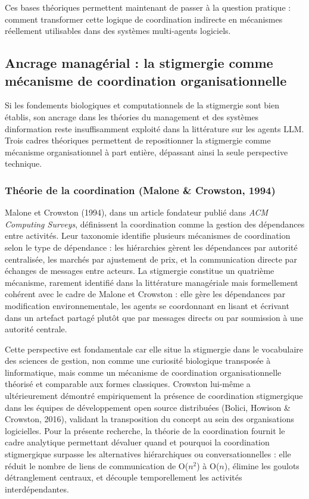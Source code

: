 \documentclass[12pt,a4paper]{article}
\begin{document}
Ces bases théoriques permettent maintenant de passer à la question
pratique : comment transformer cette logique de coordination indirecte
en mécanismes réellement utilisables dans des systèmes multi-agents
logiciels.

\subsection{Ancrage managérial : la stigmergie comme mécanisme de coordination organisationnelle}\label{ancrage-managuxe9rial--la-stigmergie-comme-muxe9canisme-de-coordination-organisationnelle}

Si les fondements biologiques et computationnels de la stigmergie sont
bien établis, son ancrage dans les théories du management et des
systèmes d\textquotesingle information reste insuffisamment exploité
dans la littérature sur les agents LLM. Trois cadres théoriques
permettent de repositionner la stigmergie comme mécanisme
organisationnel à part entière, dépassant ainsi la seule perspective
technique.

\subsubsection{Théorie de la coordination (Malone \& Crowston, 1994)}

Malone et Crowston (1994), dans un article fondateur publié dans
\emph{ACM Computing Surveys}, définissent la coordination comme la
gestion des dépendances entre activités. Leur taxonomie identifie
plusieurs mécanismes de coordination selon le type de dépendance :
les hiérarchies gèrent les dépendances par autorité centralisée, les
marchés par ajustement de prix, et la communication directe par
échanges de messages entre acteurs. La stigmergie constitue un
quatrième mécanisme, rarement identifié dans la littérature
managériale mais formellement cohérent avec le cadre de Malone et
Crowston : elle gère les dépendances par modification environnementale,
les agents se coordonnant en lisant et écrivant dans un artefact partagé
plutôt que par messages directs ou par soumission à une autorité
centrale.

Cette perspective est fondamentale car elle situe la stigmergie dans le
vocabulaire des sciences de gestion, non comme une curiosité biologique
transposée à l\textquotesingle informatique, mais comme un mécanisme de
coordination organisationnelle théorisé et comparable aux formes
classiques. Crowston lui-même a ultérieurement démontré empiriquement la
présence de coordination stigmergique dans les équipes de développement
open source distribuées (Bolici, Howison \& Crowston, 2016), validant la
transposition du concept au sein des organisations logicielles. Pour la
présente recherche, la théorie de la coordination fournit le cadre
analytique permettant d\textquotesingle évaluer quand et pourquoi la
coordination stigmergique surpasse les alternatives hiérarchiques ou
conversationnelles : elle réduit le nombre de liens de communication
de O($n^2$) à O($n$), élimine les goulots d\textquotesingle étranglement
centraux, et découple temporellement les activités interdépendantes.
\end{document}
